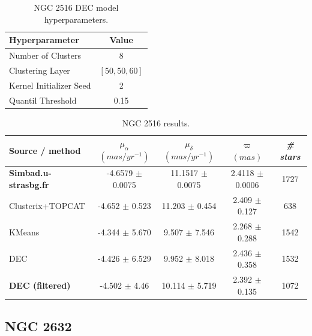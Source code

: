 \documentclass[11pt, a4paper, english]{book}
\begin{document}
\newpage

\vfill

\begin{table}[h!]
  \begin{center}
    \begin{tabular}{l|c}
      \textbf{Hyperparameter} & \textbf{Value} \\
      \hline
      Number of Clusters & 8 \\
      Clustering Layer & $\left[ 50, 50, 60 \right]$ \\
      Kernel Initializer Seed & 2 \\
      Quantil Threshold & 0.15 \\
    \end{tabular}
    \caption{NGC 2516 DEC model hyperparameters.}
    \label{tab:hyperparameters_ngc_2516}
  \end{center}
\end{table}

\begin{table}[h!]
  \begin{center}
    \begin{tabular}{l|c|c|c|c}
      \textbf{Source / method} & \textbf{$\mu_{\alpha}$ $(mas/yr^{-1})$} & \textbf{$\mu_{\delta}$ $(mas/yr^{-1})$} & \textbf{$\varpi$ $(mas)$} & \emph{\# stars} \\
      \hline
      \textbf{Simbad.u-strasbg.fr} & -4.6579 $\pm$ 0.0075 & 11.1517 $\pm$ 0.0075 & 2.4118 $\pm$ 0.0006 & 1727 \\
      Clusterix+TOPCAT & -4.652 $\pm$ 0.523 & 11.203 $\pm$ 0.454 & 2.409 $\pm$ 0.127 & 638 \\
      KMeans & -4.344 $\pm$ 5.670 & 9.507 $\pm$ 7.546 & 2.268 $\pm$ 0.288 & 1542 \\
      DEC & -4.426 $\pm$ 6.529 & 9.952 $\pm$ 8.018 & 2.436 $\pm$ 0.358 & 1532 \\
      \textbf{DEC (filtered)} & -4.502 $\pm$ 4.46 & 10.114 $\pm$ 5.719 & 2.392 $\pm$ 0.135 & 1072 \\
    \end{tabular}
    \caption{NGC 2516 results.}
    \label{tab:results_ngc_2516}
  \end{center}
\end{table}

\vfill

\newpage

\subsection{NGC 2632}
\end{document}
